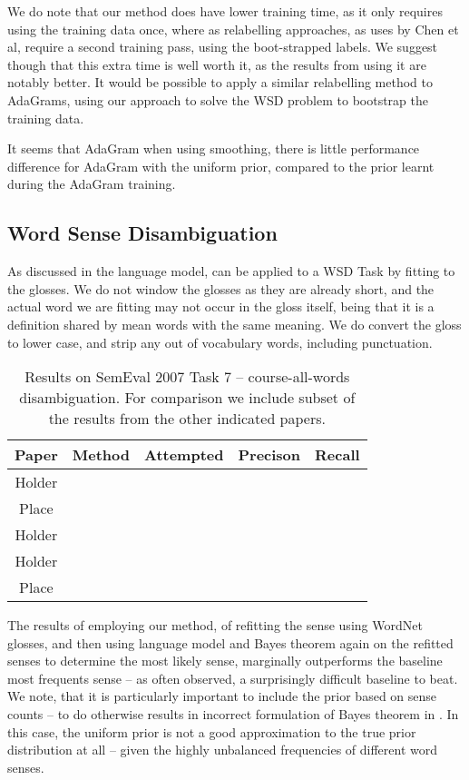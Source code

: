 \documentclass{sig-alternate}
\begin{document}
We do note that our method does have lower training time, as it only requires using the training data once, where as relabelling approaches, as uses by Chen et al, require a second training pass, using the boot-strapped labels. We suggest though that this extra time is well worth it, as the results from using it are notably better. It would be possible to apply a similar relabelling method to AdaGrams, using our approach to solve the WSD problem to bootstrap the training data.


It seems that AdaGram when using smoothing, there is little performance difference for AdaGram with the uniform prior, compared to the prior learnt during the AdaGram training.

\subsection{Word Sense Disambiguation}

As discussed in  the language model, can be applied to a WSD Task by fitting to the glosses. We do not window the glosses as they are already short, and the actual word we are fitting may not occur in the gloss itself, being that it is a definition shared by mean words with the same meaning. We do convert the gloss to lower case, and strip any out of vocabulary words, including punctuation.

\begin{table*}
	\begin{tabular}{|c|c|c|c|c|}
		\hline Paper & Method & Attempted & Precison & Recall \\ 
		\hline Holder &  &  &  &  \\ 
		\hline Place  &  &  &  &  \\ 
		\hline Holder &  &  &  &  \\ 
		\hline Holder &  &  &  &  \\ 
		\hline Place &  &  &  &  \\ 
		\hline 
	\end{tabular} 
	
	\caption{Results on SemEval 2007 Task 7 -- course-all-words disambiguation.
		For comparison we include subset of the results from the other indicated papers.
	} \label{samevalres}
\end{table*}

The results of employing our method, of refitting the sense using WordNet glosses, and then using language model and Bayes theorem again on the refitted senses to determine the most likely sense, marginally outperforms the baseline most frequents sense -- as often observed, a surprisingly difficult baseline to beat.
We note, that it is particularly important to include the prior based on sense counts -- to do otherwise results in incorrect formulation of Bayes theorem in . In this case, the uniform prior is not a good approximation to the true prior distribution at all -- given the highly unbalanced frequencies of different word senses.
\end{document}
